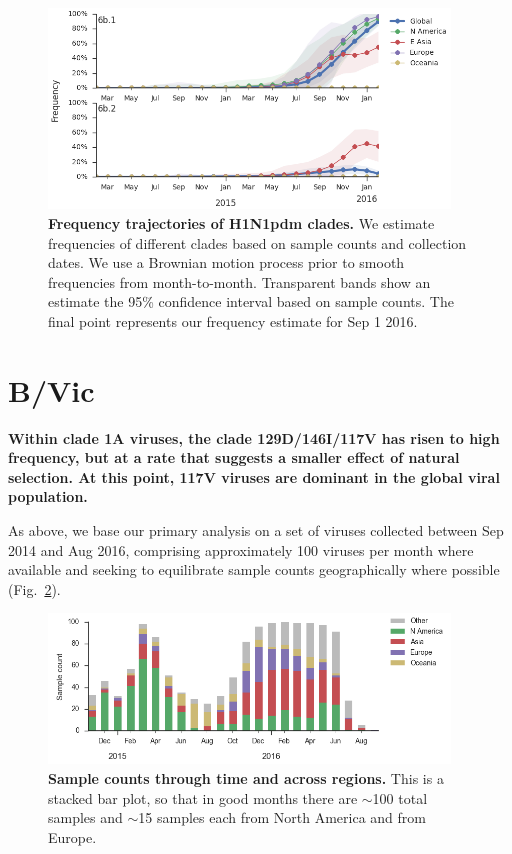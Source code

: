 \documentclass[11pt,oneside,letterpaper]{article}
\begin{document}
\begin{figure}[H]
	\centering
	\includegraphics[width=0.95\textwidth]{../figures/feb-2016/H1N1pdm_clades.png}
	\caption{\textbf{Frequency trajectories of H1N1pdm clades.}
	We estimate frequencies of different clades based on sample counts and collection dates.
	We use a Brownian motion process prior to smooth frequencies from month-to-month.
	Transparent bands show an estimate the 95\% confidence interval based on sample counts.
	The final point represents our frequency estimate for Sep 1 2016.
	}
	\label{H1N1pdm_clades}
\end{figure}

\clearpage
\pagebreak

\section*{B/Vic}

\textbf{Within clade 1A viruses, the clade 129D/146I/117V has risen to high frequency, but at a rate that suggests a smaller effect of natural selection. At this point, 117V viruses are dominant in the global viral population.}

As above, we base our primary analysis on a set of viruses collected between Sep 2014 and Aug 2016, comprising approximately 100 viruses per month where available and seeking to equilibrate sample counts geographically where possible (Fig.\ \ref{Vic_counts}).

\begin{figure}[H]
	\centering
	\includegraphics[width=0.95\textwidth]{../figures/sep-2016/Vic_counts.png}
	\caption{\textbf{Sample counts through time and across regions.}
	This is a stacked bar plot, so that in good months there are $\sim$100 total samples and $\sim$15 samples each from North America and from Europe.
	}
	\label{Vic_counts}
\end{figure}
\end{document}
